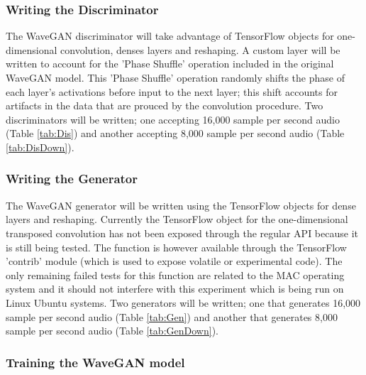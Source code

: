 \documentclass[a4paper, dvipsnames, titlepage]{article}
\begin{document}
\subsubsection{Writing the Discriminator}

The WaveGAN discriminator will take advantage of TensorFlow objects for one-dimensional convolution, denses layers and reshaping.
A custom layer will be written to account for the 'Phase Shuffle' operation included in the original WaveGAN model.
This 'Phase Shuffle' operation randomly shifts the phase of each layer's activations before input to the next layer; this shift accounts for artifacts in the data that are prouced by the convolution procedure.
Two discriminators will be written; one accepting 16,000 sample per second audio (Table \ref{tab:Dis}) and another accepting 8,000 sample per second audio (Table \ref{tab:DisDown}).

\subsubsection{Writing the Generator}

The WaveGAN generator will be written using the TensorFlow objects for dense layers and reshaping.
Currently the TensorFlow object for the one-dimensional transposed convolution has not been exposed through the regular API because it is still being tested.
The function is however available through the TensorFlow 'contrib' module (which is used to expose volatile or experimental code).
The only remaining failed tests for this function are related to the MAC operating system and it should not interfere with this experiment which is being run on Linux Ubuntu systems.
Two generators will be written; one that generates 16,000 sample per second audio (Table \ref{tab:Gen}) and another that generates 8,000 sample per second audio (Table \ref{tab:GenDown}).

\subsubsection{Training the WaveGAN model}
\end{document}
